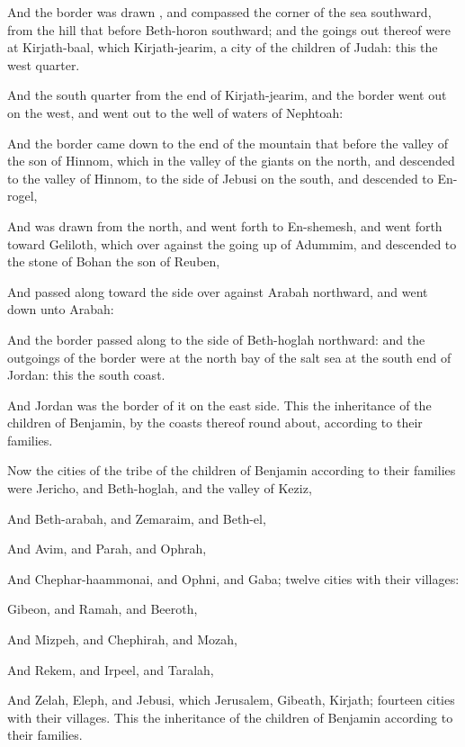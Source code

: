 {And the
border was
drawn
{}, and
compassed the
corner of the
sea
southward, from the
hill that
{}
before
Beth-horon
southward; and the goings
out thereof were at
Kirjath-baal, which
{}
Kirjath-jearim, a
city of the
children of
Judah: this
{} the
west
quarter.

And the
south
quarter
{} from the
end of
Kirjath-jearim, and the
border went
out on the
west, and went
out to the
well of
waters of
Nephtoah:

And the
border came
down to the
end of the
mountain that
{}
before the
valley of the
son of
Hinnom,
{} which
{} in the
valley of the
giants on the
north, and
descended to the
valley of
Hinnom, to the
side of
Jebusi on the
south, and
descended to
En-rogel,

And was
drawn from the
north, and went
forth to
En-shemesh, and went
forth toward
Geliloth, which
{} over
against the going
up of
Adummim, and
descended to the
stone of
Bohan the
son of
Reuben,

And passed
along toward the
side over
against
Arabah
northward, and went
down unto
Arabah:

And the
border passed
along to the
side of
Beth-hoglah
northward: and the
outgoings of the
border were at the
north
bay of the
salt
sea at the
south
end of
Jordan: this
{} the
south
coast.

And
Jordan was the
border of it on the
east
side. This
{} the
inheritance of the
children of
Benjamin, by the
coasts thereof round
about, according to their
families.

Now the
cities of the
tribe of the
children of
Benjamin according to their
families were
Jericho, and
Beth-hoglah, and the
valley of
Keziz,

And
Beth-arabah, and
Zemaraim, and
Beth-el,

And
Avim, and
Parah, and
Ophrah,

And
Chephar-haammonai, and
Ophni, and
Gaba;
twelve
cities with their
villages:

Gibeon, and
Ramah, and
Beeroth,

And
Mizpeh, and
Chephirah, and
Mozah,

And
Rekem, and
Irpeel, and
Taralah,

And
Zelah,
Eleph, and
Jebusi, which
{}
Jerusalem,
Gibeath,
{}
Kirjath;
fourteen
cities with their
villages. This
{} the
inheritance of the
children of
Benjamin according to their
families.




}
